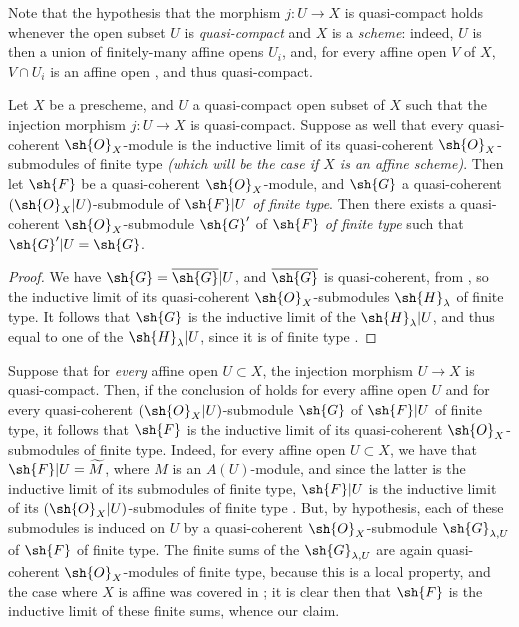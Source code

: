 Note that the hypothesis that the morphism $j:U\to X$ is quasi-compact
holds whenever the open subset $U$ is \emph{quasi-compact} and $X$ is a
\emph{scheme}: indeed, $U$ is then a union of finitely-many affine opens $U_i$,
and, for every affine open $V$ of $X$, $V\cap U_i$ is an affine open , and
thus quasi-compact.

\begin{corollary}[9.4.3]
\label{I.9.4.3}
Let $X$ be a prescheme, and $U$ a quasi-compact open subset of $X$ such that the injection
morphism $j:U\to X$ is quasi-compact. Suppose as well that every quasi-coherent
$\sh{O}_X$-module is the inductive limit of its quasi-coherent $\sh{O}_X$-submodules of finite type
\emph{(which will be the case if $X$ is an \emph{affine scheme})}. Then let $\sh{F}$ be a
quasi-coherent $\sh{O}_X$-module, and $\sh{G}$ a quasi-coherent $(\sh{O}_X|U)$-submodule of $\sh{F}|U$ \emph{of finite type}. Then there exists a quasi-coherent $\sh{O}_X$-submodule $\sh{G}'$ of
$\sh{F}$ \emph{of finite type} such that $\sh{G}'|U=\sh{G}$.
\end{corollary}

\begin{proof}
We have $\sh{G}=\overline{\sh{G}}|U$, and $\overline{\sh{G}}$ is quasi-coherent, from
, so the inductive limit of its quasi-coherent $\sh{O}_X$-submodules
$\sh{H}_\lambda$ of finite type. It follows that $\sh{G}$ is the inductive limit of the
$\sh{H}_\lambda|U$, and thus equal to one of the $\sh{H}_\lambda|U$, since it is of finite
type .
\end{proof}

\begin{remark}[9.4.4]
\label{I.9.4.4}
Suppose that for \emph{every} affine open $U\subset X$, the injection morphism $U\to X$ is
quasi-compact. Then, if the conclusion of  holds for every affine open $U$
and for every quasi-coherent $(\sh{O}_X|U)$-submodule $\sh{G}$ of $\sh{F}|U$ of finite type,
it follows that $\sh{F}$ is the inductive limit of its quasi-coherent $\sh{O}_X$-submodules of finite type.
Indeed, for every affine open $U\subset X$, we have that $\sh{F}|U=\widetilde{M}$, where $M$
 is an $A(U)$-module, and since the latter is the inductive limit of its
submodules of finite type, $\sh{F}|U$ is the inductive limit of its $(\sh{O}_X|U)$-submodules of
finite type . But, by hypothesis, each of these submodules is induced on $U$
by a quasi-coherent $\sh{O}_X$-submodule $\sh{G}_{\lambda,U}$ of $\sh{F}$ of finite type. The
finite sums of the $\sh{G}_{\lambda,U}$ are again quasi-coherent $\sh{O}_X$-modules of finite
type, because this is a local property, and the case where $X$ is affine was covered in
; it is clear then that $\sh{F}$ is the inductive limit of these finite
sums, whence our claim.
\end{remark}

